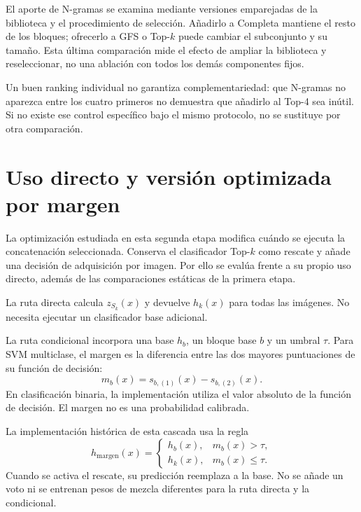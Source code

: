 El aporte de N-gramas se examina mediante versiones emparejadas de la biblioteca y el procedimiento de selección. Añadirlo a Completa mantiene el resto de los bloques; ofrecerlo a GFS o Top-\(k\) puede cambiar el subconjunto y su tamaño. Esta última comparación mide el efecto de ampliar la biblioteca y reseleccionar, no una ablación con todos los demás componentes fijos.

Un buen ranking individual no garantiza complementariedad: que N-gramas no aparezca entre los cuatro primeros no demuestra que añadirlo al Top-4 sea inútil. Si no existe ese control específico bajo el mismo protocolo, no se sustituye por otra comparación.

\section{Uso directo y versión optimizada por margen}
La optimización estudiada en esta segunda etapa modifica cuándo se ejecuta la concatenación seleccionada. Conserva el clasificador Top-\(k\) como rescate y añade una decisión de adquisición por imagen. Por ello se evalúa frente a su propio uso directo, además de las comparaciones estáticas de la primera etapa.

La ruta directa calcula \(z_{S_k}(x)\) y devuelve \(h_k(x)\) para todas las imágenes. No necesita ejecutar un clasificador base adicional.

La ruta condicional incorpora una base \(h_b\), un bloque base \(b\) y un umbral \(\tau\). Para SVM multiclase, el margen es la diferencia entre las dos mayores puntuaciones de su función de decisión:
\begin{equation}
m_b(x)=s_{b,(1)}(x)-s_{b,(2)}(x).
\label{eq:tk-margin}
\end{equation}
En clasificación binaria, la implementación utiliza el valor absoluto de la función de decisión. El margen no es una probabilidad calibrada.

La implementación histórica de esta cascada usa la regla
\begin{equation}
h_{\mathrm{margen}}(x)=
\begin{cases}
h_b(x),&m_b(x)>\tau,\\
h_k(x),&m_b(x)\leq\tau .
\end{cases}
\label{eq:tk-rule}
\end{equation}
Cuando se activa el rescate, su predicción reemplaza a la base. No se añade un voto ni se entrenan pesos de mezcla diferentes para la ruta directa y la condicional.

